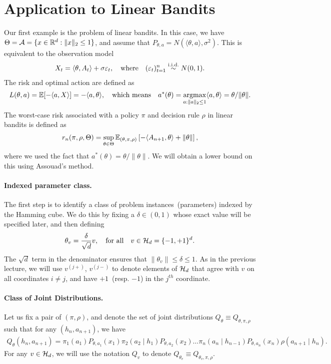 \documentclass[12pt]{article}
\begin{document}
\section{Application to Linear Bandits}
\label{sec:linear-bandits}
Our first example is the problem  of linear bandits. In this case, we have $\Theta= {\cal A} = \{x \in \mathbb{R}^d: \|x\|_2 \leq 1\}$, and assume that $P_{\theta, a} = N(\langle \theta, a \rangle, \sigma^2)$. This is equivalent to the observation model 
\begin{align}
X_t = \langle \theta, A_t \rangle + \sigma \varepsilon_t, \quad \text{where} \quad (\varepsilon_t)_{t=1}^n \overset{\text{i.i.d.}}{\sim} N(0,1). 
\end{align}
The risk  and  optimal action are defined as 
\begin{align}
L(\theta, a) = \mathbb{E}[-\langle a, X\rangle] = -\langle a, \theta \rangle, \quad \text{which means} \quad 
a^*(\theta) = \operatorname*{argmax}_{a:\|a\|_2 \leq 1} \langle a, \theta \rangle = \theta/\|\theta\|. 
\end{align}
The worst-case risk associated with a policy $\pi$ and decision rule $\rho$ in linear bandits is defined as 
\begin{align}
r_n(\pi, \rho, \Theta) = \sup_{\theta \in \Theta} \mathbb{E}_{(\theta, \pi, \rho )}\left[ -\langle A_{n+1}, \theta \rangle + \|\theta\| \right], 
\end{align}
where we used the fact that $a^*(\theta) = \theta/\|\theta\|$. We will obtain a lower bound on this using Assouad's method. 

\paragraph{Indexed parameter class.} The first step is to identify a class of problem instances~(parameters) indexed by the Hamming cube. We do this by fixing a $\delta \in (0, 1)$ whose exact value will be specified later, and then defining
\begin{align}
\theta_v = \frac{\delta}{\sqrt{d}} v, \quad \text{for all} \quad v \in {\cal H}_d = \{-1, +1\}^d. 
\end{align}
The $\sqrt{d}$ term in the denominator ensures that $\|\theta_v\| \leq \delta \leq 1$. As in the previous lecture, we will use $v^{(j+)}$, $v^{(j-)}$ to denote elements of ${\cal H}_d$ that agree with $v$ on all coordinates $i \neq j$, and have $+1$~(resp. $-1$) in the $j^{th}$ coordinate. 

\paragraph{Class of Joint Distributions.} Let us fix a pair of $(\pi, \rho)$, and denote the set of joint distributions $Q_\theta \equiv Q_{\theta, \pi, \rho}$ such that for any $(h_n, a_{n+1})$, we have  
\begin{align}
Q_{\theta}(h_n, a_{n+1}) =  \pi_1(a_1)  P_{\theta, a_1}(x_1) \pi_2(a_2 \mid h_1) P_{\theta, a_2}(x_2) \ldots \pi_n(a_n \mid h_{n-1}) P_{\theta, a_n}(x_n) \rho(a_{n+1} \mid h_{n}). 
\end{align}
For any $v \in {\cal H}_d$, we will use the notation $Q_{v}$ to denote $Q_{\theta_v} \equiv Q_{\theta_v, \pi, \rho}$.  
\end{document}
